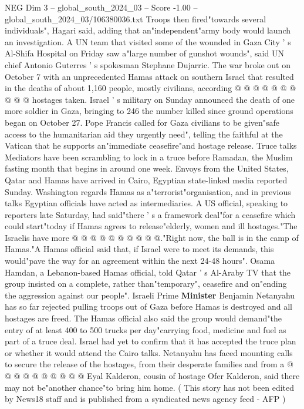 \begin{textsample}{NEG Dim 3 – global\_south\_2024\_03 – Score -1.00 – global\_south\_2024\_03/106380036.txt}
Troops then fired"towards several individuals", Hagari said, adding that an"independent"army body would launch an investigation.
A UN team that visited some of the wounded in Gaza City ' s Al-Shifa Hospital on Friday saw a"large number of gunshot wounds", said UN chief Antonio Guterres ' s spokesman Stephane Dujarric.
The war broke out on October 7 with an unprecedented Hamas attack on southern Israel that resulted in the deaths of about 1,160 people, mostly civilians, according @ @ @ @ @ @ @ @ @ @ hostages taken.
Israel ' s military on Sunday announced the death of one more soldier in Gaza, bringing to 246 the number killed since ground operations began on October 27.
Pope Francis called for Gaza civilians to be given"safe access to the humanitarian aid they urgently need", telling the faithful at the Vatican that he supports an"immediate ceasefire"and hostage release.
Truce talks Mediators have been scrambling to lock in a truce before Ramadan, the Muslim fasting month that begins in around one week.
Envoys from the United States, Qatar and Hamas have arrived in Cairo, Egyptian state-linked media reported Sunday.
Washington regards Hamas as a"terrorist"organisation, and in previous talks Egyptian officials have acted as intermediaries.
A US official, speaking to reporters late Saturday, had said"there ' s a framework deal"for a ceasefire which could start"today if Hamas agrees to release"elderly, women and ill hostages."The Israelis have more @ @ @ @ @ @ @ @ @ @."Right now, the ball is in the camp of Hamas."A Hamas official said that, if Israel were to meet its demands, this would"pave the way for an agreement within the next 24-48 hours".
Osama Hamdan, a Lebanon-based Hamas official, told Qatar ' s Al-Araby TV that the group insisted on a complete, rather than"temporary", ceasefire and on"ending the aggression against our people".
Israeli Prime \textbf{Minister} Benjamin Netanyahu has so far rejected pulling troops out of Gaza before Hamas is destroyed and all hostages are freed.
The Hamas official also said the group would demand"the entry of at least 400 to 500 trucks per day"carrying food, medicine and fuel as part of a truce deal.
Israel had yet to confirm that it has accepted the truce plan or whether it would attend the Cairo talks.
Netanyahu has faced mounting calls to secure the release of the hostages, from their desperate families and from a @ @ @ @ @ @ @ @ @ @ Eyal Kalderon, cousin of hostage Ofer Kalderon, said there may not be"another chance"to bring him home. ( This story has not been edited by News18 staff and is published from a syndicated news agency feed - AFP )

\end{textsample}
